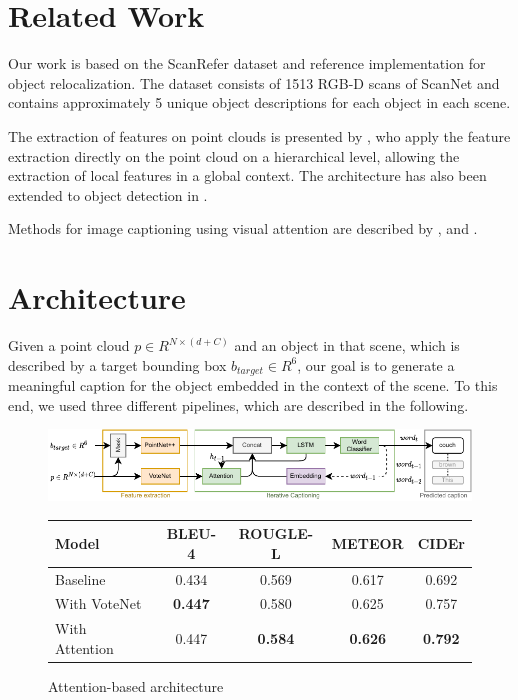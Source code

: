 \documentclass[10pt,twocolumn,letterpaper]{article}
\begin{document}
\section{Related Work}
Our work is based on the ScanRefer \cite{chen2019scanrefer} dataset and reference implementation for object relocalization. The dataset consists of 1513 RGB-D scans of ScanNet \cite{dai2017scannet} and contains approximately 5 unique object descriptions for each object in each scene.

The extraction of features on point clouds is presented by \cite{qi2017pointnet++}, who apply the feature extraction directly on the point cloud on a hierarchical level, allowing the extraction of local features in a global context. 
The architecture has also been extended to object detection in \cite{qi2019deep}. 

Methods for image captioning using visual attention are described by \cite{xu2015show}, \cite{lu2017knowing} and \cite{anderson2018bottom}.

\section{Architecture}

Given a point cloud $\mathit{p \in R^{N\times(d+C)}}$ and an object in that scene, which is described by a target bounding box $b_{target}\in R^6$, our goal is to generate a meaningful caption for the object embedded in the context of the scene. To this end, we used three different pipelines, which are described in the following.

\begin{figure}	
	\centering
	\begin{minipage}[b]{.55\textwidth}
		\includegraphics[width=.95\textwidth]{figures/arch_condensed_2.pdf}
		\caption{Attention-based architecture}
		\label{fig:arch}
	\end{minipage}
	\begin{minipage}[b]{.44\textwidth}
		{\scriptsize 
			\begin{tabular}{|l|cccc|}
			\hline
			\textbf{Model} & \textbf{BLEU-4} & \textbf{ROUGLE-L} & \textbf{METEOR} & \textbf{CIDEr}\\
			\hline
			Baseline & 0.434 & 0.569 & 0.617 & 0.692 \\
			With VoteNet & \textbf{0.447} & 0.580 & 0.625 & 0.757 \\
			With Attention & 0.447 & \textbf{0.584} & \textbf{0.626} & \textbf{0.792} \\
			\hline
		\end{tabular}}
		\vspace{.5\baselineskip}
		\label{tab:quantitative_results}
	\end{minipage}
\end{figure}
\end{document}
